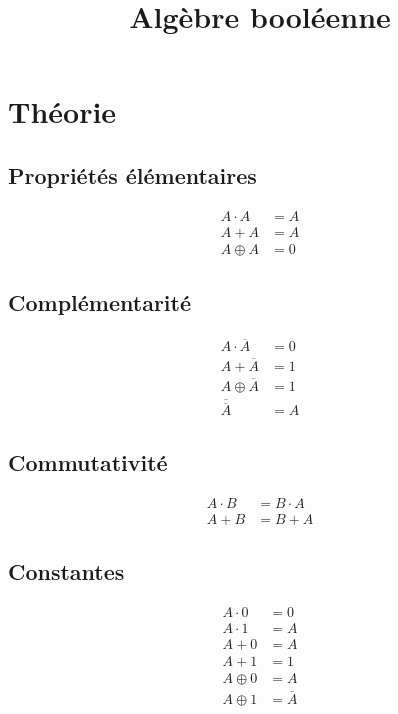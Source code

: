 \documentclass{article}
\title{\vspace{-5ex}Algèbre booléenne}
\date{\vspace{-5ex}}
\begin{document}
\maketitle
\section{Théorie}

\begin{multicols}{2}
\subsection{Propriétés élémentaires}
\begin{align}
    A \cdot A & = A \\
    A + A & = A \\
    A \oplus A & = 0 
\end{align}

\subsection{Complémentarité}
\begin{align}
    A \cdot \overline{A} & = 0 \\
    A + \overline{A} & = 1 \\
    A \oplus \overline{A} & = 1 \\
    \overline{\overline{A}} & = A 
\end{align}

\subsection{Commutativité}
\begin{align}
    A \cdot B & = B \cdot A \\
    A + B & = B + A 
\end{align}

\subsection{Constantes}
\begin{align}
    A \cdot 0 & = 0 \\
    A \cdot 1 & = A \\
    A + 0 & = A \\
    A + 1 & = 1 \\
    A \oplus 0 & = A \\
    A \oplus 1 & = \overline{A}
\end{align}


\end{multicols}
\end{document}
